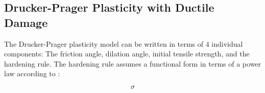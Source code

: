 \subsection{Drucker-Prager Plasticity with Ductile Damage}

The Drucker-Prager plasticity model can be written in terms of 4 individual
components: The friction angle, dilation angle, initial tensile strength,
and the hardening rule. The hardening rule assumes a functional form
in terms of a power law according to \cite{prantl_identification_2013}:

\begin{equation}
\sigma
\end{equation}
